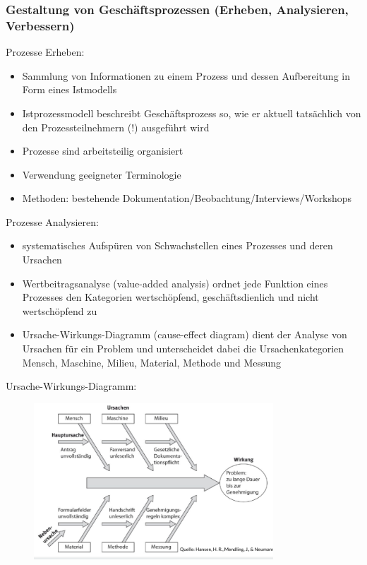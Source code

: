\subsubsection{Gestaltung von Geschäftsprozessen (Erheben, Analysieren, Verbessern)}
Prozesse Erheben:
\begin{itemize}
  \item Sammlung von Informationen zu einem Prozess und dessen Aufbereitung in Form eines Istmodells
  \item Istprozessmodell beschreibt Geschäftsprozess so, wie er aktuell tatsächlich von den Prozessteilnehmern (!) ausgeführt wird
  \item Prozesse sind arbeitsteilig organisiert
  \item Verwendung geeigneter Terminologie
  \item Methoden: bestehende Dokumentation/Beobachtung/Interviews/Workshops
\end{itemize}

Prozesse Analysieren:
\begin{itemize}
  \item systematisches Aufspüren von Schwachstellen eines Prozesses und deren Ursachen
  \item Wertbeitragsanalyse (value-added analysis) ordnet jede Funktion eines Prozesses den Kategorien wertschöpfend, geschäftsdienlich und nicht wertschöpfend zu
  \item Ursache-Wirkungs-Diagramm (cause-effect diagram) dient der Analyse von Ursachen für ein Problem und unterscheidet dabei die Ursachenkategorien Mensch, Maschine, Milieu, Material, Methode und Messung
\end{itemize}
Ursache-Wirkungs-Diagramm:
\par
\begin{figure}[htp]
\begin{center}
\includegraphics[width=0.8\textwidth]{assets/UrsacheWirkungDIa.PNG}
\end{center}
\end{figure}

